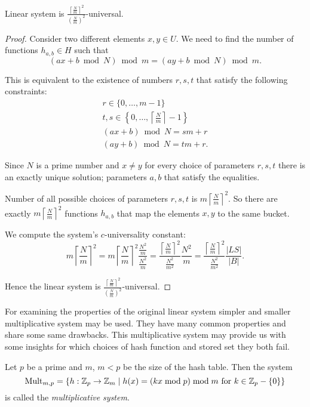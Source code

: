 \begin{remark}
Linear system is $\frac{\left\lceil \frac{N}{m} \right\rceil ^ 2}{\left(\frac{N}{m}\right) ^ 2}$-universal.
\end{remark}
\begin{proof}
Consider two different elements $x, y \in U$. We need to find the number of functions $h_{a, b} \in H$ such that 
\[ (ax + b \bmod N) \bmod m = (ay + b \bmod N) \bmod m \text{.} \]

This is equivalent to the existence of numbers $r, s, t$ that satisfy the following constraints:
\begin{gather*}
r \in \{0, \dots, m - 1 \} \\
t, s \in \left\{ 0, \dots, \left \lceil \frac{N}{m} \right \rceil - 1 \right\} \\
(ax + b) \bmod N = s m + r \\
(ay + b) \bmod N = t m + r \text{.}
\end{gather*}

Since $N$ is a prime number and $x \neq y$ for every choice of parameters $r, s, t$ there is an exactly unique solution; parameters $a, b$ that satisfy the equalities.

Number of all possible choices of parameters $r, s, t$ is $m \left \lceil \frac{N}{m} \right \rceil ^ 2$. So there are exactly $m \left \lceil \frac{N}{m} \right \rceil ^ 2$ functions $h_{a, b}$ that map the elements $x, y$ to the same bucket.

We compute the system's $c$-universality constant:
\[
m \left \lceil \frac{N}{m} \right \rceil ^ 2 = 
m \left \lceil \frac{N}{m} \right \rceil ^ 2 \frac{\frac{N ^ 2}{m}}{\frac{N ^ 2}{m}} = 
\frac{\left \lceil \frac{N}{m} \right \rceil ^ 2}{\frac{N ^ 2}{m ^ 2}} \frac{N ^ 2}{m} = 
\frac{\left \lceil \frac{N}{m} \right \rceil ^ 2}{\frac{N ^ 2}{m ^ 2}} \frac{|LS|}{|B|} \text{.}
\]

Hence the linear system is $\frac{\left \lceil \frac{N}{m} \right \rceil ^ 2}{\left(\frac{N}{m}\right) ^ 2}$-universal.
\end{proof}

For examining the properties of the original linear system simpler and smaller multiplicative system may be used. They have many common properties and share some same drawbacks. This multiplicative system may provide us with some insights for which choices of hash function and stored set they both fail.

\begin{definition}
Let $p$ be a prime and $m$, $m < p$ be the size of the hash table. Then the system \[ \mathrm{Mult}_{m, p} = \lbrace h:\mathbb{Z}_p \rightarrow \mathbb{Z}_m \mid h(x) = (kx \bmod p) \bmod m \text{ for } k \in \mathbb{Z}_p - \{0\} \rbrace \] is called the \emph{multiplicative system}.
\end{definition}

